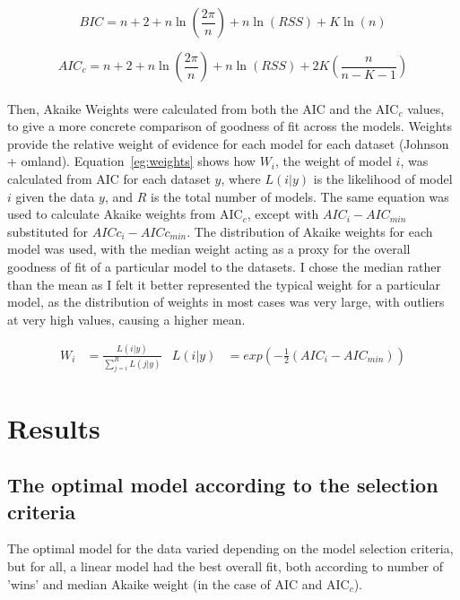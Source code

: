\documentclass[11pt]{article}
\begin{document}
	\begin{equation} \label{eq:BIC}
	BIC = n + 2 + n\ln
		\left(
			\frac{2\pi}{n}								\right) 
	+ n\ln(RSS) + K\ln(n)
	\end{equation}
	
	\begin{equation} \label{eq:AICc}
	AIC_c = n + 2 + n\ln
		\left(
			\frac{2\pi}{n}								\right) 
	+ n\ln(RSS) + 2K 
		\left(
			\frac{n}{n - K - 1}
		\right)
	\end{equation}
	\\
	Then, Akaike Weights were calculated from both the AIC and the AIC$_c$ values, to give a more concrete comparison of goodness of fit across the models. Weights provide the relative weight of evidence for each model for each dataset (Johnson + omland). Equation~\ref{eg:weights} shows how $W_i$, the weight of model $i$, was calculated from AIC for each dataset $y$, where $L(i | y)$ is the likelihood of model $i$ given the data $y$, and $R$ is the total number of models. The same equation was used to calculate Akaike weights from AIC$_c$, except with $AIC_i - AIC_{min}$ substituted for $AICc_i - AICc_{min}$. The distribution of Akaike weights for each model was used, with the median weight acting as a proxy for the overall goodness of fit of a particular model to the datasets. I chose the median rather than the mean as I felt it better represented the typical weight for a particular model, as the distribution of weights in most cases was very large, with outliers at very high values, causing a higher mean.
	
	\begin{align} \label{eg:weights}
	W_i &= \frac{L(i | y)}{\sum_{j = i}^{R}L(j | y) }
	& L(i | y) &= exp(-\frac{1}{2} (AIC_i - AIC_{min})) 
	\end{align}
	
\section{Results}

\subsection{The optimal model according to the selection criteria}
The optimal model for the data varied depending on the model selection criteria, but for all, a linear model had the best overall fit, both according to number of 'wins' and median Akaike weight (in the case of AIC and AIC$_c$).
\end{document}
